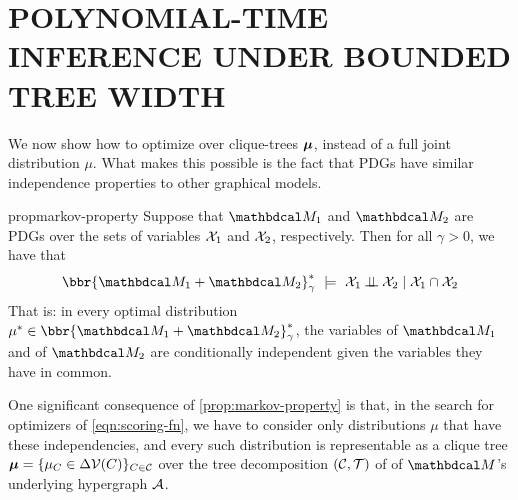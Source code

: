 \documentclass[twoside]{article}
\begin{document}
\section{POLYNOMIAL-TIME INFERENCE UNDER BOUNDED TREE WIDTH}
    \label{sec:clique-tree-expcone}

We now show how to optimize over clique-trees $\boldsymbol\mu$, instead of a full joint distribution $\mu$. What makes this possible is the fact that PDGs have similar independence properties to other graphical models. 

\begin{linked}{prop}{markov-property}
    Suppose that $\dg M_1$ and $\dg M_2$ are PDGs
    over the sets of variables $\mathcal X_1$ and $\mathcal X_2$, respectively.
	Then for all $\gamma > 0$, we have that
	\[
	 	\bbr{\dg M_1 \bundle \dg M_2}^*_\gamma
			~\models~
		\X_1 \mathbin{\bot\!\!\!\bot} \X_2 \mid \X_1 \cap \X_2
	\]
	That is: in every optimal distribution $\mu^* \in \bbr{\dg M_1 \bundle \dg M_2}^*_\gamma$,
    the variables of $\dg M_1$ and of $\dg M_2$ are conditionally independent given the variables they have in common.
\end{linked}

One significant consequence of \cref{prop:markov-property} is that, in the
search for optimizers of \eqref{eqn:scoring-fn}, we have to
consider only distributions $\mu$ that have these independencies,
and every such distribution is representable as 
a clique tree 
$\boldsymbol\mu = \{\mu_C \in \Delta\mathcal V(C) \}_{C \in \mathcal C}$
over the tree decomposition $(\cal C, T)$ of
of $\dg M$'s underlying hypergraph $\mathcal A$. 
\end{document}
